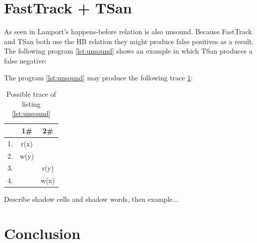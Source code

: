 \documentclass[12pt]{article}
\begin{document}
	\section{FastTrack + TSan}\label{fasttrack-sec}
	
	As seen in \cite{marthur} Lamport's happens-before relation is also unsound. Because FastTrack and TSan both use the HB relation they might produce false positives as a result. The following program \ref{lst:unsound} shows an example in which TSan produces a false negative:
	
	The program \ref{lst:unsound} may produce the following trace \ref{trace3}:
	\begin{table}[H]
		\begin{center}
			\begin{tabular}{ c c c}
				& 1\# & 2\# \\
				\hline
				1. & r(x) & \\
				2. & w(y) & \\
				3. & & r(y) \\
				4. & & w(x) \\
			\end{tabular}
			\caption{Possible trace of listing \ref{lst:unsound}}
			\label{trace3}
		\end{center}
	\end{table}
	Describe shadow cells and shadow words, then example...
	
	
	
	\section{Conclusion}
	\newpage                                          
	\printbibliography[heading= bibintoc, title={List of Literature}]
	\newpage
	{\hypersetup{linkcolor=black}
		\listoffigures
		\newpage
		\listoftables
		\newpage
		\lstlistoflistings
	}
\end{document}
